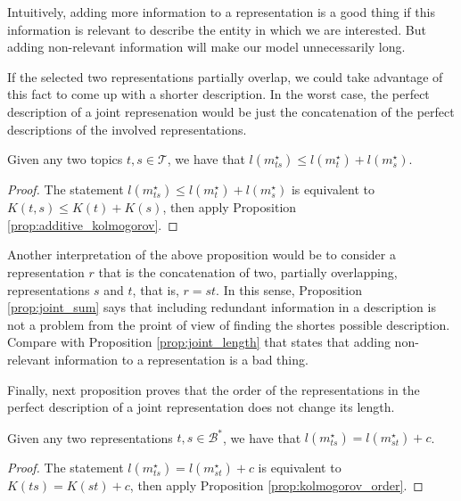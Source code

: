 Intuitively, adding more information to a representation is a good thing if this information is relevant to describe the entity in which we are interested. But adding non-relevant information will make our model unnecessarily long.

If the selected two representations partially overlap, we could take advantage of this fact to come up with a shorter description. In the worst case, the perfect description of a joint represenation would be just the concatenation of the perfect descriptions of the involved representations.

\begin{proposition}
\label{prop:joint_sum}
Given any two topics $t,s \in \mathcal{T}$, we have that $l \left( m_{ts}^{\star} \right) \leq l \left( m_{t}^{\star} \right) + l \left( m_{s}^{\star} \right)$.
\end{proposition}
\begin{proof}
The statement $l \left( m_{ts}^{\star} \right) \leq l \left( m_{t}^{\star} \right) + l \left( m_{s}^{\star} \right)$ is equivalent to $K(t,s) \leq K(t) + K(s)$, then apply Proposition \ref{prop:additive_kolmogorov}.
\end{proof}

Another interpretation of the above proposition would be to consider a representation $r$ that is the concatenation of two, partially overlapping, representations $s$ and $t$, that is, $r = st$. In this sense, Proposition \ref{prop:joint_sum} says that including redundant information in a description is not a problem from the proint of view of finding the shortes possible description. Compare with Proposition \ref{prop:joint_length} that states that adding non-relevant information to a representation is a bad thing.

Finally, next proposition proves that the order of the representations in the perfect description of a joint representation does not change its length.

\begin{proposition}
\label{prop:joint_order}
Given any two representations $t, s \in \mathcal{B}^\ast$, we have that $l \left( m_{ts}^{\star} \right) = l \left( m_{st}^{\star} \right) + c$.
\end{proposition}
\begin{proof}
The statement $l \left( m_{ts}^{\star} \right) = l \left( m_{st}^{\star} \right) + c$ is equivalent to $K(ts) = K(st) + c$, then apply Proposition \ref{prop:kolmogorov_order}.
\end{proof}

